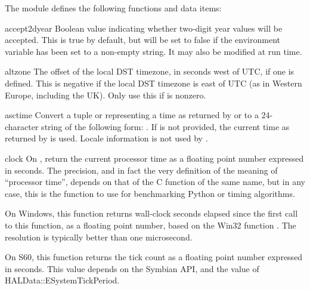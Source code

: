 The module defines the following functions and data items:


\begin{datadesc}{accept2dyear}
Boolean value indicating whether two-digit year values will be
accepted.  This is true by default, but will be set to false if the
environment variable  has been set to a non-empty
string.  It may also be modified at run time.
\end{datadesc}

\begin{datadesc}{altzone}
The offset of the local DST timezone, in seconds west of UTC, if one
is defined.  This is negative if the local DST timezone is east of UTC
(as in Western Europe, including the UK).  Only use this if
 is nonzero.
\end{datadesc}

\begin{funcdesc}{asctime}{}
Convert a tuple or  representing a time as returned
by 
or  to a 24-character string of the following form:
.  If  is not provided, the
current time as returned by  is used.
Locale information is not used by .
\end{funcdesc}

\begin{funcdesc}{clock}{}
On \UNIX, return
the current processor time as a floating point number expressed in
seconds.  The precision, and in fact the very definition of the meaning
of ``processor time'', depends
on that of the C function of the same name, but in any case, this is
the function to use for benchmarking Python or
timing algorithms.

On Windows, this function returns wall-clock seconds elapsed since the
first call to this function, as a floating point number,
based on the Win32 function .
The resolution is typically better than one microsecond.

On S60, this function returns the tick count as a floating point number
expressed in seconds. This value depends on the Symbian API,
 and the value of
HALData::ESystemTickPeriod.
\end{funcdesc}

